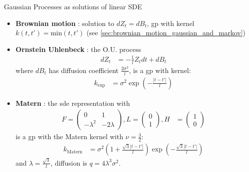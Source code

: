 \begin{frame}{Gaussian Processes as solutions of linear SDE}
    \begin{itemize}
        \item \textbf{Brownian motion} : solution to $dZ_t = dB_t$, \gls{gp} with kernel $k(t,t') = \text{min}(t,t')$ (see \ref{sec:brownian_motion_gaussian_and_markov})
        \item \textbf{Ornstein Uhlenbeck} : the O.U. process
            \begin{align}
                dZ_t &= - \frac{1}{l} Z_t dt + dB_t
            \end{align}
            where $dB_t$ has diffusion coefficient $\frac{2 \sigma^{2}}{l}$, is a \gls{gp} with kernel:
            \begin{align}
                k_{\text{exp}} &= \sigma^{2} \exp{(- \frac{\vert t-t' \vert}{l})}
            \end{align}
        \item \textbf{Matern} : the \gls{sde} representation with
            \begin{align}
                F = \begin{pmatrix}
                    0 & 1 \\
                    -\lambda^{2} & -2 \lambda 
                \end{pmatrix}, 
                L = \begin{pmatrix}
                    0 \\ 1
                \end{pmatrix}, 
                H &= \begin{pmatrix}
                    1 \\ 0
                \end{pmatrix}
            \end{align}
            is a \gls{gp} with the Matern kernel with $\nu = \frac{3}{2}$:
            \begin{align}
                k_{\text{Matern}} &= \sigma^{2} \left(
                    1 + \frac{\sqrt{3} \vert t-t' \vert}{l}
                \right) \exp{
                    \left(
                        -\frac{\sqrt{3} \vert t-t' \vert}{l}
                    \right)
                }
        \end{align}
        and $\lambda = \frac{\sqrt{3}}{l}$, diffusion is $q = 4\lambda^{3}\sigma^{2}$.
    \end{itemize}
\end{frame}



